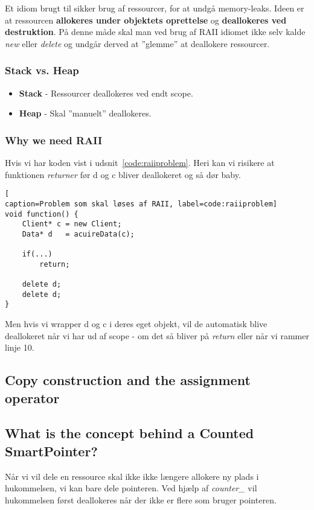 Et idiom brugt til sikker brug af ressourcer, for at undgå memory-leaks. Ideen er at ressourcen \textbf{allokeres under objektets oprettelse} og \textbf{deallokeres ved destruktion}. På denne måde skal man ved brug af RAII idiomet ikke selv kalde \textit{new} eller \textit{delete} og undgår derved at ''glemme'' at deallokere ressourcer.

\subsubsection{Stack vs. Heap}
\begin{itemize}
	\item \textbf{Stack} - Ressourcer deallokeres ved endt scope.
	\item \textbf{Heap} - Skal ''manuelt'' deallokeres.
\end{itemize}

\subsubsection{Why we need RAII}
Hvis vi har koden vist i udsnit~\ref{code:raiiproblem}. Heri kan vi risikere at funktionen \textit{returner} før d og c bliver deallokeret og så dør baby.

\begin{minipage}{\linewidth}
\begin{lstlisting}[
caption=Problem som skal løses af RAII, label=code:raiiproblem]
void function() {
	Client* c = new Client;
	Data* d   = acuireData(c);
	
	if(...)
		return;
	
	delete d;
	delete d; 
}
\end{lstlisting}
\end{minipage}

Men hvis vi wrapper d og c i deres eget objekt, vil de automatisk blive deallokeret når vi har ud af scope - om det så bliver på \textit{return} eller når vi rammer linje 10.

\subsection{Copy construction and the assignment operator}

\subsection{What is the concept behind a Counted SmartPointer?}
Når vi vil dele en ressource skal ikke ikke længere allokere ny plads i hukommelsen, vi kan bare dele pointeren. Ved hjælp af \textit{counter\_} vil hukommelsen først deallokeres når der ikke er flere som bruger pointeren.\\

